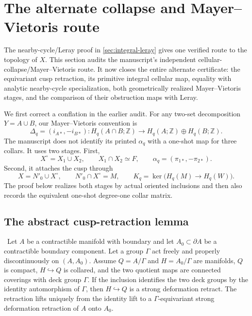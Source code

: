 \section{The alternate collapse and Mayer--Vietoris route}

The nearby-cycle/Leray proof in \cref{sec:integral-leray} gives one verified
route to the topology of $X$.  This section audits the manuscript's independent
cellular-collapse/Mayer--Vietoris route.  It now closes the entire alternate
certificate: the equivariant cusp retraction, its primitive integral cellular
map, equality with analytic nearby-cycle specialization, both geometrically
realized Mayer--Vietoris stages, and the comparison of their obstruction maps
with Leray.

We first correct a conflation in the earlier audit.  For any two-set
decomposition $Y=A\cup B$, our Mayer--Vietoris convention is
\[
\Delta_q=(i_{A*},-i_{B*}):
H_q(A\cap B;\mathbb Z)\longrightarrow
H_q(A;\mathbb Z)\oplus H_q(B;\mathbb Z).
\tag{4.1}
\]
The manuscript does not identify its printed $\alpha_q$ with a one-shot map
for three collars.  It uses two stages.  First,
\[
X^\circ=X_1\cup X_2,
\qquad X_1\cap X_2\simeq F,
\qquad
\alpha_q=(\pi_{1*},-\pi_{2*}).
\tag{4.2}
\]
Second, it attaches the cusp through
\[
X=N'_0\cup X^\circ,
\qquad N'_0\cap X^\circ=M,
\qquad
K_q=\ker\bigl(H_q(M)\to H_q(W)\bigr).
\tag{4.3}
\]
The proof below realizes both stages by actual oriented inclusions and then
also records the equivalent one-shot degree-one collar matrix.

\subsection{The abstract cusp-retraction lemma}

\begin{proposition}\label{prop:topological-spine}
\Verified\ Let $A$ be a contractible manifold with boundary and let
$A_0\subset\partial A$ be a contractible boundary component.  Let a
group $\Gamma$ act freely and properly discontinuously on $(A,A_0)$.  Assume
$Q=A/\Gamma$ and $H=A_0/\Gamma$ are manifolds, $Q$ is compact,
$H\hookrightarrow Q$ is collared, and the two quotient maps are connected
coverings with deck group $\Gamma$.  If the inclusion identifies the two
deck groups by the identity automorphism of $\Gamma$, then
$H\hookrightarrow Q$ is a strong deformation retract.  The retraction lifts
uniquely from the identity lift to a $\Gamma$-equivariant strong deformation
retraction of $A$ onto $A_0$.
\end{proposition}

